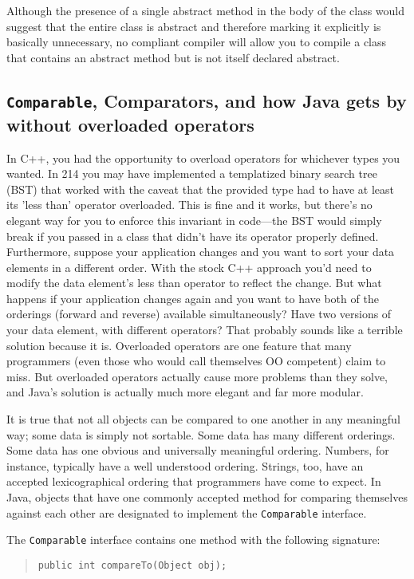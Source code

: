 \documentclass[12pt]{article}
\begin{document}
Although the presence of a single abstract method in the body of the class
would suggest that the entire class is abstract and therefore marking it
explicitly is basically unnecessary, no compliant compiler will allow you
to compile a class that contains an abstract method but is not itself
declared abstract.

\subsection{\texttt{Comparable}, Comparators, and how Java gets by without
  overloaded operators}

In C++, you had the opportunity to overload operators for whichever types
you wanted.  In 214 you may have implemented a templatized binary search
tree (BST) that worked with the caveat that the provided type had to have
at least its 'less than' operator overloaded.  This is fine and it works, but
there's no elegant way for you to enforce this invariant in code---the BST
would simply break if you passed in a class that didn't have its operator
properly defined.  Furthermore, suppose your application changes and you
want to sort your data elements in a different order.  With the stock C++
approach you'd need to modify the data element's less than operator to
reflect the change.  But what happens if your application changes again and
you want to have both of the orderings (forward and reverse) available
simultaneously?  Have two versions of your data element, with different
operators?  That probably sounds like a terrible solution because it is.
Overloaded operators are one feature that many programmers (even those who
would call themselves OO competent) claim to miss.  But overloaded
operators actually cause more problems than they solve, and Java's solution
is actually much more elegant and far more modular.

It is true that not all objects can be compared to one another in any
meaningful way; some data is simply not sortable.  Some data has many
different orderings.  Some data has one obvious and universally meaningful
ordering.  Numbers, for instance, typically have a well understood
ordering.  Strings, too, have an accepted lexicographical ordering that
programmers have come to expect.  In Java, objects that have one commonly
accepted method for comparing themselves against each other are designated
to implement the \texttt{Comparable} interface.

The \texttt{Comparable} interface contains one method with the
following signature:
\begin{quote}
\begin{verbatim}
public int compareTo(Object obj);
\end{verbatim}
\end{quote}
\end{document}
